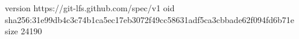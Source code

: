 version https://git-lfs.github.com/spec/v1
oid sha256:31e99db4c3c74b1ca5ec17eb3072f49cc58631adf5ca3cbbade62f094fd6b71e
size 24190
